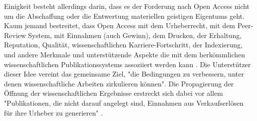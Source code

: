 Einigkeit besteht allerdings darin, dass es der Forderung nach Open Access nicht um die Abschaffung oder die Entwertung materiellen geistigen Eigentums geht. Kaum jemand bestreitet, dass Open Access mit dem Urheberrecht, mit dem Peer-Review System, mit Einnahmen (auch Gewinn), dem Drucken, der Erhaltung, Reputation, Qualität, wissenschaftlichen Karriere-Fortschritt, der Indexierung, und andere Merkmale und unterstützende Aspekte die mit dem herkömmlichen wissenschaftlichen Publikationssystems assoziiert werden kann \cite{suber_2015}. Die Unterstützer dieser Idee vereint das gemeinsame Ziel, "die Bedingungen zu verbessern, unter denen wissenschaftliche Arbeiten zirkulieren können"\cite{Adema_2014_open_access}. Die Propagierung der Öffnung der wissenschaftlichen Ergebnisse erstreckt sich dabei vor allem "Publikationen, die nicht darauf angelegt sind, Einnahmen aus Verkaufserlösen für ihre Urheber zu generieren" \cite{muller_2010_open}.

